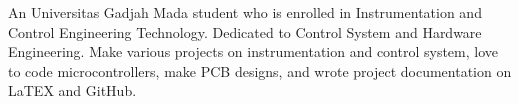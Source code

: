 

\begin{cvparagraph}

An Universitas Gadjah Mada student who is enrolled in Instrumentation and Control Engineering Technology. Dedicated to Control System and Hardware Engineering. Make various projects on instrumentation and control system, love to code microcontrollers, make PCB designs, and wrote project documentation on LaTEX and GitHub.
\end{cvparagraph}